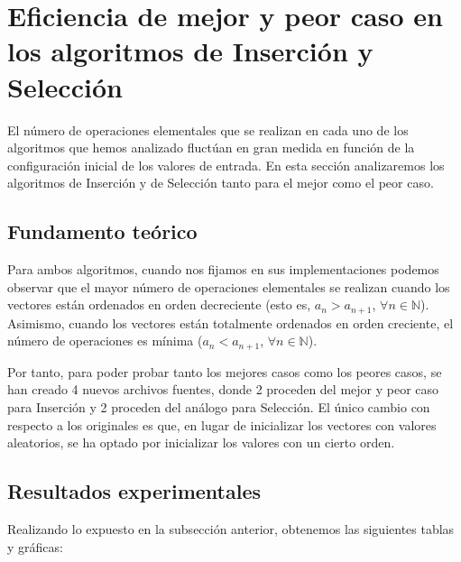 \documentclass{homework}
\begin{document}
    \section{Eficiencia de mejor y peor caso en los algoritmos de Inserción y Selección}

    El número de operaciones elementales que se realizan en cada uno de los algoritmos que hemos analizado fluctúan 
    en gran medida en función de la configuración inicial de los valores de entrada. En esta sección analizaremos los
    algoritmos de Inserción y de Selección tanto para el mejor como el peor caso.

    \subsection{Fundamento teórico}

    Para ambos algoritmos, cuando nos fijamos en sus implementaciones podemos observar que el mayor número de operaciones
    elementales se realizan cuando los vectores están ordenados en orden decreciente (esto es, $a_n > a_{n+1}$, $\forall n \in \mathbb N$).
    Asimismo, cuando los vectores están totalmente ordenados en orden creciente, el número de operaciones es mínima ($a_n < a_{n+1}$, $\forall n \in \mathbb N$).

    Por tanto, para poder probar tanto los mejores casos como los peores casos, se han creado 4 nuevos archivos fuentes, donde
    2 proceden del mejor y peor caso para Inserción y 2 proceden del análogo para Selección. El único cambio con respecto a los originales es que,
    en lugar de inicializar los vectores con valores aleatorios, se ha optado por inicializar los valores con un cierto orden.

    \subsection{Resultados experimentales}

    Realizando lo expuesto en la subsección anterior, obtenemos las siguientes tablas y gráficas:
\end{document}
